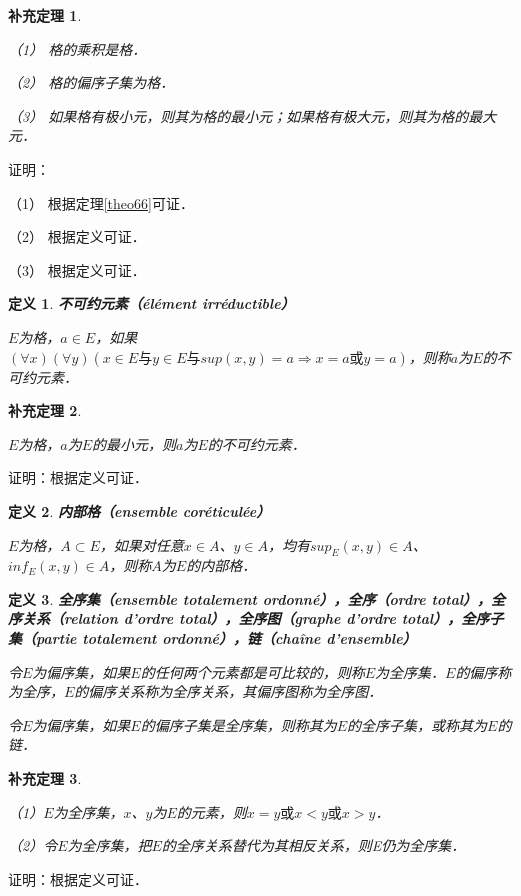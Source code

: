 \documentclass[12pt, a4paper, oneside]{book}
\newtheorem{cor}{补充定理}
\newtheorem{de}{定义}
\begin{document}
			\begin{cor}\label{cor188}
				\hfill\par
				（1）	格的乘积是格．
				\par
				（2）	格的偏序子集为格．
				\par
				（3）	如果格有极小元，则其为格的最小元；如果格有极大元，则其为格的最大元．
			\end{cor}
			证明：
			\par
			（1）	根据定理\ref{theo66}可证．
			\par
			（2）	根据定义可证．
			\par
			（3）	根据定义可证．

			\begin{de}
				\textbf{不可约元素（élément irréductible）}
				\par
				$E$为格，$a\in E$，如果$(\forall x)(\forall y)(x\in E\text{与}y\in E\text{与} sup(x, y)=a\Rightarrow x=a\text{或}y=a)$，则称$a$为$E$的不可约元素．
			\end{de}
			
			\begin{cor}\label{cor189}
				\hfill\par
				$E$为格，$a$为$E$的最小元，则$a$为$E$的不可约元素．
			\end{cor}
			证明：根据定义可证．

			\begin{de}
				\textbf{内部格（ensemble coréticulée）}
				\par
				$E$为格，$A\subset E$，如果对任意$x\in A$、$y\in A$，均有$sup_E(x, y)\in A$、$inf_E(x, y)\in A$，则称$A$为$E$的内部格．
			\end{de}

			\begin{de}
				\textbf{全序集（ensemble totalement ordonné），全序（ordre total），全序关系（relation d'ordre total），全序图（graphe d'ordre total），全序子集（partie totalement ordonné），链（chaîne d'ensemble）}
				\par
				令$E$为偏序集，如果$E$的任何两个元素都是可比较的，则称$E$为全序集．$E$的偏序称为全序，$E$的偏序关系称为全序关系，其偏序图称为全序图．
				\par
				令$E$为偏序集，如果$E$的偏序子集是全序集，则称其为$E$的全序子集，或称其为$E$的链．
			\end{de}
			
			\begin{cor}\label{cor190}
				\hfill\par
				（1）$E$为全序集，$x$、$y$为$E$的元素，则$x=y\text{或}x<y\text{或}x>y$．
				\par
				（2）令$E$为全序集，把$E$的全序关系替代为其相反关系，则E仍为全序集．
			\end{cor}
			证明：根据定义可证．
			
\end{document}
